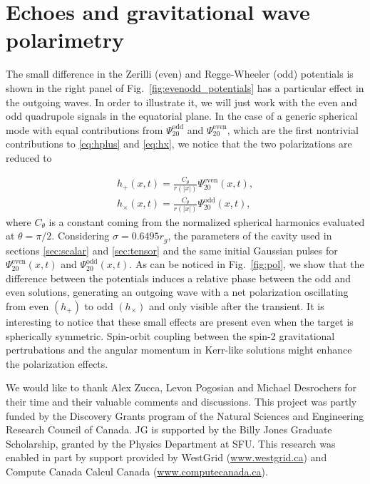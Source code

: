 \documentclass[article,aps,nofootinbib,twocolumn,superscriptaddress]{revtex4-1}
\begin{document}
\appendix
\section{Echoes and gravitational wave polarimetry}
\label{sec:AppendixPolar}


The small difference in the Zerilli (even) and Regge-Wheeler (odd) potentials is shown in the right panel of Fig.~\ref{fig:evenodd_potentials} has a particular effect in the outgoing waves. In order to illustrate it, we will just work with the even and odd quadrupole signals in the equatorial plane. In the case of a generic spherical mode with equal contributions from $\Psi^{\mathrm{odd}}_{20}$ and $\Psi^{\mathrm{even}}_{20} $, which are the first nontrivial contributions to \eqref{eq:hplus} and \eqref{eq:hx}, we notice that the two polarizations are reduced to

\begin{eqnarray}
h_+(x,t)=\frac{C_{\theta}}{r(|x|)}\Psi^{\mathrm{even}}_{20}(x,t),\nonumber\\
h_{\times}(x,t)=\frac{C_{\theta}}{r(|x|)}\Psi^{\mathrm{odd}}_{20}(x,t),\label{eq:pols}
\end{eqnarray}
where $C_{\theta}$ is a constant coming from the normalized spherical harmonics evaluated at $\theta=\pi/2$. Considering $\sigma=0.6495 r_g$, the parameters of the cavity used in sections \ref{sec:scalar} and \ref{sec:tensor} and the same initial Gaussian pulses for $\Psi^{\mathrm{even}}_{20}(x,t)$ and $\Psi^{\mathrm{odd}}_{20}(x,t)$.  As can be noticed in Fig.~\ref{fig:pol}, we show that the difference between the potentials induces a relative phase between the odd and even solutions, generating an outgoing wave with a net polarization oscillating from even $(h_+)$ to odd $(h_{\times})$ and only visible after the transient. It is interesting to notice that these small effects are present even when the target is spherically symmetric. Spin-orbit coupling between the spin-2 gravitational pertrubations and the angular momentum in Kerr-like solutions might enhance the polarization effects.
    
\begin{acknowledgments}
We would like to thank Alex Zucca, Levon Pogosian and Michael Desrochers for their time and their valuable comments and discussions. This project was partly funded by the Discovery Grants program of the Natural Sciences and Engineering Research Council of Canada. JG is supported by the Billy Jones Graduate Scholarship, granted by the Physics Department at SFU. This research was enabled in part by support provided by WestGrid (\url{www.westgrid.ca}) and Compute Canada Calcul Canada (\url{www.computecanada.ca}).
\end{acknowledgments}

\end{document}
